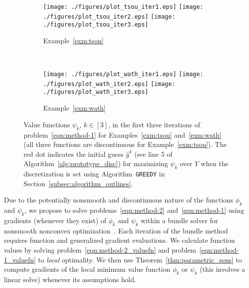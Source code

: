 \documentclass{article}
\newcommand{\1}[1]{\mathds{1}\left[#1\right]}
\begin{document}
\begin{figure}[t]
\centering
\begin{subfigure}{\textwidth}
\texttt{[image: ./figures/plot\_tsou\_iter1.eps]}%
\hfill
\texttt{[image: ./figures/plot\_tsou\_iter2.eps]}%
\hfill
\texttt{[image: ./figures/plot\_tsou\_iter3.eps]}
\caption{Example~\ref{exm:tsou}}
\end{subfigure}\\
\begin{subfigure}{\textwidth}
\texttt{[image: ./figures/plot\_wath\_iter1.eps]}%
\hfill
\texttt{[image: ./figures/plot\_wath\_iter2.eps]}%
\hfill
\texttt{[image: ./figures/plot\_wath\_iter3.eps]}
\caption{Example~\ref{exm:wath}}
\end{subfigure}
\caption{Value functions $\psi_k$, $k \in [3]$, in the first three iterations of problem~\eqref{eqn:method-1} for Examples~\ref{exm:tsou} and~\ref{exm:wath} (all three functions are discontinuous for Example~\ref{exm:tsou}). The red dot indicates the initial guess $\hat{y}^k$ (see line 5 of Algorithm~\ref{alg:prototype_disc}) for maximizing $\psi_k$ over $Y$ when the discretization is set using Algorithm~\texttt{GREEDY} in Section~\ref{subsec:algorithm_outlines}.
}
\label{fig:value-funcs_2}
\end{figure}




Due to the potentially nonsmooth and discontinuous nature of the functions $\phi_k$ and $\psi_k$, we propose to solve problems~\eqref{eqn:method-2} and~\eqref{eqn:method-1} using gradients (whenever they exist) of $\phi_k$ and $\psi_k$ within a bundle solver for nonsmooth nonconvex optimization~\cite{makela2003multiobjective}.
Each iteration of the bundle method requires function and generalized gradient evaluations.
We calculate function values by solving problem~\eqref{eqn:method-2_valuefn} and problem~\eqref{eqn:method-1_valuefn} to \textit{local} optimality.
We then use Theorem~\ref{thm:parametric_sens} to compute gradients of the local minimum value function $\phi_k$ or $\psi_k$ (this involves a linear solve) whenever its assumptions hold.
\end{document}
